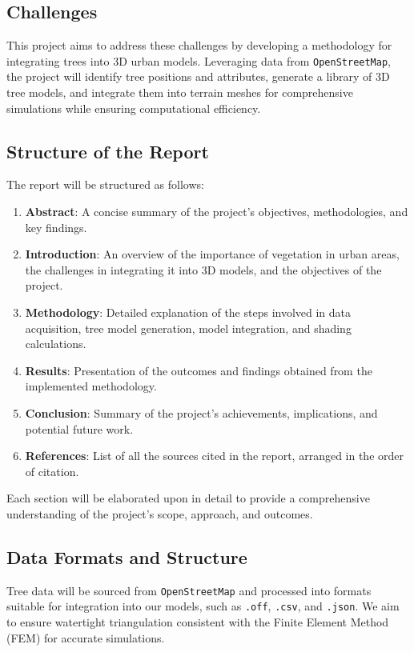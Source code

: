 \documentclass[12pt]{article}
\begin{document}
\newpage

\subsection{Challenges}
This project aims to address these challenges by developing a methodology for 
integrating trees into 3D urban models. Leveraging data from \texttt{OpenStreetMap},
the  project will identify tree positions and attributes, generate a library of 3D tree 
models, and integrate them into terrain meshes for comprehensive simulations while
ensuring computational efficiency.

\subsection{Structure of the Report}

The report will be structured as follows:

\begin{enumerate}
    \item \textbf{Abstract}: A concise summary of the project's objectives, methodologies, 
    and key findings.
    
    \item \textbf{Introduction}: An overview of the importance of vegetation in urban areas, 
    the challenges in integrating it into 3D models, and the objectives of the project.
    
    \item \textbf{Methodology}: Detailed explanation of the steps involved in data acquisition, 
    tree model generation, model integration, and shading calculations.
    
    \item \textbf{Results}: Presentation of the outcomes and findings obtained from the 
    implemented methodology.
    
    \item \textbf{Conclusion}: Summary of the project's achievements, implications, and 
    potential future work.
    
    \item \textbf{References}: List of all the sources cited in the report, arranged in 
    the order of citation.
\end{enumerate}

Each section will be elaborated upon in detail to provide a comprehensive understanding 
of the project's scope, approach, and outcomes.


\subsection{Data Formats and Structure}
Tree data will be sourced from \texttt{OpenStreetMap} and processed into formats suitable for 
integration into our models, such as \texttt{.off}, \texttt{.csv}, and \texttt{.json}.
We aim to ensure watertight triangulation consistent with the Finite Element Method
(FEM) for accurate simulations.  
\end{document}
